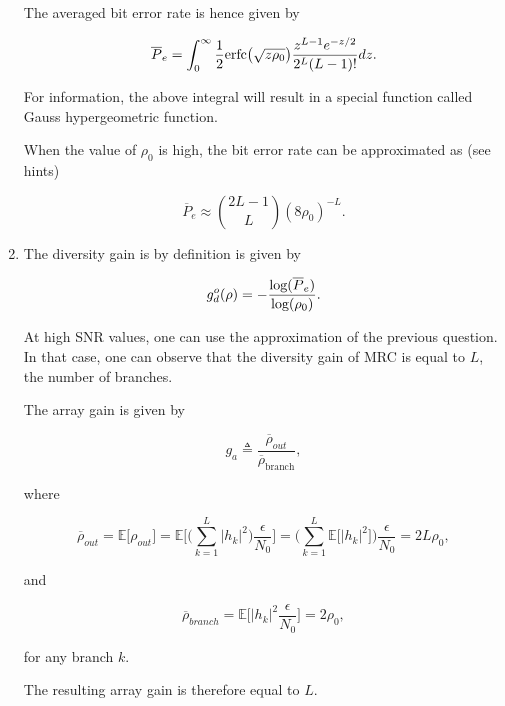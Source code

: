 \documentclass [a4paper, 11pt] {article}
\begin{document}
\begin{solution}
\begin{enumerate}
    The averaged bit error rate is hence given by 
    
    \begin{equation}
    \overline{P}_e = \int_{0}^{\infty} \frac{1}{2}\text{\normalfont erfc}\big(\sqrt{z \rho_0}\big) \frac{z^{L-1}e^{-z/2}}{2^L(L-1)!} dz.
    \end{equation}
    
    For information, the above integral will result in a special function called Gauss hypergeometric function. 
    
    When the value of $\rho_0$ is high, the bit error rate can be approximated as (see hints) 
    
    \begin{equation}
    \overline{P}_e \approx \binom{2L-1}{L} (8\rho_0)^{-L}.
    \end{equation}
    
    \item The diversity gain is by definition is given by 
    
    \begin{equation}
        g_d^o(\rho) = -\frac{\text{\normalfont log}(\overline{P}_e)}{\text{\normalfont log}(\rho_0)}.
    \end{equation}
    
    At high SNR values, one can use the approximation of the previous question. In that case, one can observe that the diversity gain of MRC is equal to $L$, the number of branches. 
    
    The array gain is given by
    
    \begin{equation}
    g_a \triangleq \frac{\overline{\rho}_{out}}{\overline{\rho}_{\text{branch}}},   
    \end{equation}
    
    where 
    
    \begin{equation}\overline{\rho}_{out} = \mathbb{E}\big[ \rho_{out} \big] =  \mathbb{E}\Bigg[ \bigg( \sum_{k=1}^{L} |h_k|^2 \bigg) \dfrac{\epsilon}{N_0} \Bigg] =  \bigg( \sum_{k=1}^{L} \mathbb{E}\big[ |h_k|^2 \big] \bigg) \dfrac{\epsilon}{N_0} = 2L \rho_0,
    \end{equation}
    
    and 
    
    \begin{equation}\overline{\rho}_{branch} = \mathbb{E}\bigg[|h_k|^2 \dfrac{\epsilon}{N_0} \bigg] = 2 \rho_0,
    \end{equation}
    
    for any branch $k$.
    
    The resulting array gain is therefore equal to $L$.
    
\end{enumerate}


    \end{solution}
    
\end{document}

